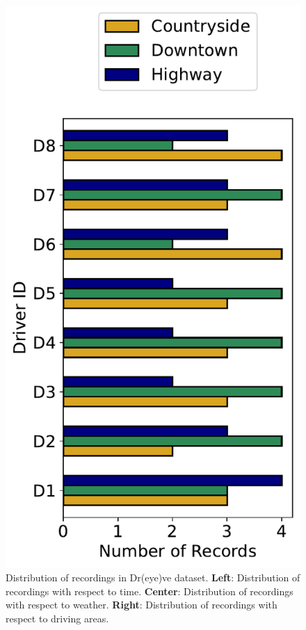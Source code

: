 \begin{figure}[h]
\begin{minipage}{0.33\textwidth}
        \includegraphics[width=\textwidth]{images/dreyeve/area_distrib.pdf}
    \end{minipage}\hfill
    \caption{Distribution of recordings in Dr(eye)ve dataset. 
    \textbf{Left}: Distribution of recordings with respect to time.
    \textbf{Center}: Distribution of recordings with respect to weather.
    \textbf{Right}: Distribution of recordings with respect to driving areas.}
    \label{fig:dreyeve_rec_distrib}
\end{figure}

